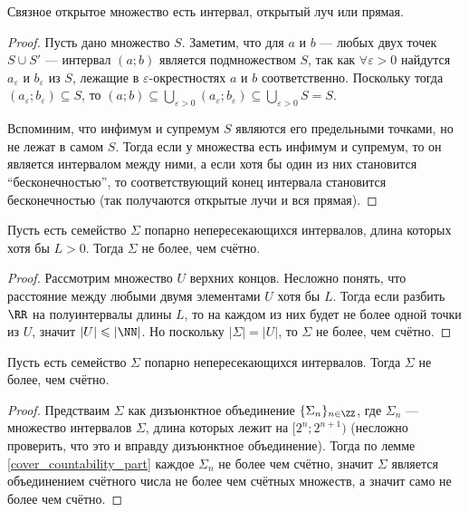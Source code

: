 \documentclass[12pt,a4paper]{article}
\begin{document}
    \begin{enumproblem}[\textcolor{green}{сдано}]
        \begin{lemma}\label{open_connected_set_classification_lemma}
            Связное открытое множество есть интервал, открытый луч или прямая.
        \end{lemma}

        \begin{proof}
            Пусть дано множество $S$. Заметим, что для $a$ и $b$ --- любых двух точек $S \cup S'$  --- интервал $(a;b)$ является подмножеством $S$, так как $\forall \varepsilon > 0$ найдутся $a_\varepsilon$ и $b_\varepsilon$ из $S$, лежащие в $\varepsilon$-окрестностях $a$ и $b$ соответственно. Поскольку тогда $(a_\varepsilon;b_\varepsilon) \subseteq S$, то $(a;b) \subseteq \bigcup_{\varepsilon > 0} (a_\varepsilon;b_\varepsilon) \subseteq \bigcup_{\varepsilon > 0} S = S$.

            Вспоминим, что инфимум и супремум $S$ являются его предельными точками, но не лежат в самом $S$. Тогда если у множества есть инфимум и супремум, то он является интервалом между ними, а если хотя бы один из них становится ``бесконечностью'', то соответствующий конец интервала становится бесконечностью (так получаются открытые лучи и вся прямая).
        \end{proof}

        \begin{lemma}\label{cover_countability_part}
            Пусть есть семейство $\Sigma$ попарно непересекающихся интервалов, длина которых хотя бы $L > 0$. Тогда $\Sigma$ не более, чем счётно.
        \end{lemma}

        \begin{proof}
            Рассмотрим множество $U$ верхних концов. Несложно понять, что расстояние между любыми двумя элементами $U$ хотя бы $L$. Тогда если разбить $\RR$ на полуинтервалы длины $L$, то на каждом из них будет не более одной точки из $U$, значит $|U| \leqslant |\NN|$. Но поскольку $|\Sigma| = |U|$, то $\Sigma$ не более, чем счётно.
        \end{proof}

        \begin{lemma}\label{cover_countability_lemma}
            Пусть есть семейство $\Sigma$ попарно непересекающихся интервалов. Тогда $\Sigma$ не более, чем счётно.
        \end{lemma}

        \begin{proof}
            Предстваим $\Sigma$ как дизъюнктное объединение $\{\Sigma_n\}_{n \in \ZZ}$, где $\Sigma_n$ --- множество интервалов $\Sigma$, длина которых лежит на $[2^n;2^{n+1})$ (несложно проверить, что это и вправду дизъюнктное объединение). Тогда по лемме \ref{cover_countability_part} каждое $\Sigma_n$ не более чем счётно, значит $\Sigma$ является объединением счётного числа не более чем счётных множеств, а значит само не более чем счётно.
        \end{proof}


\end{enumproblem}
\end{document}
